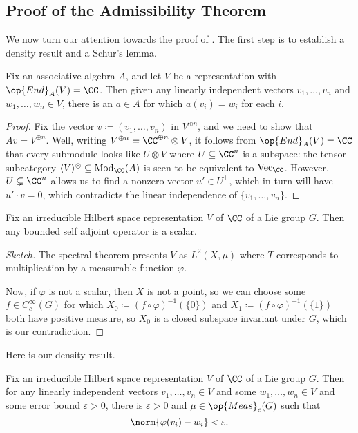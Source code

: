 \documentclass[../notes.tex]{subfiles}
\begin{document}
\subsection{Proof of the Admissibility Theorem}
We now turn our attention towards the proof of . The first step is to establish a density result and a Schur's lemma.
\begin{lemma}
	Fix an associative algebra $A$, and let $V$ be a representation with $\op{End}_A(V)=\CC$. Then given any linearly independent vectors $v_1,\ldots,v_n$ and $w_1,\ldots,w_n\in V$, there is an $a\in A$ for which $a(v_i)=w_i$ for each $i$.
\end{lemma}
\begin{proof}
	Fix the vector $v\coloneqq(v_1,\ldots,v_n)$ in $V^{\oplus n}$, and we need to show that $Av=V^{\oplus n}$. Well, writing $V^{\oplus n}=\CC^{\oplus n}\otimes V$, it follows from $\op{End}_A(V)=\CC$ that every submodule looks like $U\otimes V$ where $U\subseteq\CC^n$ is a subspace: the tensor subcategory $\langle V\rangle^\otimes\subseteq\mathrm{Mod}_\CC(A)$ is seen to be equivalent to $\mathrm{Vec}_\CC$. However, $U\subsetneq\CC^n$ allows us to find a nonzero vector $u'\in U^\perp$, which in turn will have $u'\cdot v=0$, which contradicts the linear independence of $\{v_1,\ldots,v_n\}$.
\end{proof}
\begin{proposition}
	Fix an irreducible Hilbert space representation $V$ of $\CC$ of a Lie group $G$. Then any bounded self adjoint operator is a scalar.
\end{proposition}
\begin{proof}[Sketch]
	The spectral theorem presents $V$ as $L^2(X,\mu)$ where $T$ corresponds to multiplication by a measurable function $\varphi$.

	Now, if $\varphi$ is not a scalar, then $X$ is not a point, so we can choose some $f\in C_c^\infty(G)$ for which $X_0\coloneqq(f\circ\varphi)^{-1}(\{0\})$ and $X_1\coloneqq(f\circ\varphi)^{-1}(\{1\})$ both have positive measure, so $X_0$ is a closed subspace invariant under $G$, which is our contradiction.
\end{proof}
Here is our density result.
\begin{corollary}[Density]
	Fix an irreducible Hilbert space representation $V$ of $\CC$ of a Lie group $G$. Then for any linearly independent vectors $v_1,\ldots,v_n\in V$ and some $w_1,\ldots,w_n\in V$ and some error bound $\varepsilon>0$, there is $\varepsilon>0$ and $\mu\in\op{Meas}_c(G)$ such that
	\[\norm{\varphi(v_i)-w_i}<\varepsilon.\]
\end{corollary}
\end{document}
